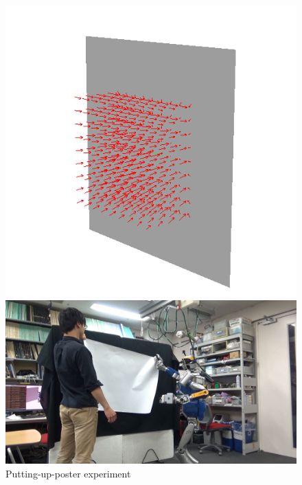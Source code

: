 \vspace{-8mm}
\begin{figure}[htbp]
  \begin{minipage}{0.4\hsize}
    \begin{center}
      \includegraphics[width=0.90\columnwidth]{figs/electronic-potential-wall.png}
    \end{center}
  \end{minipage}
  \begin{minipage}{0.55\hsize}
    \begin{center}
      \includegraphics[width=1.00\columnwidth]{figs/image_poster.png}
    \end{center}
  \end{minipage}
  \caption{Putting-up-poster experiment}
  \label{figure:poster}
\end{figure}

